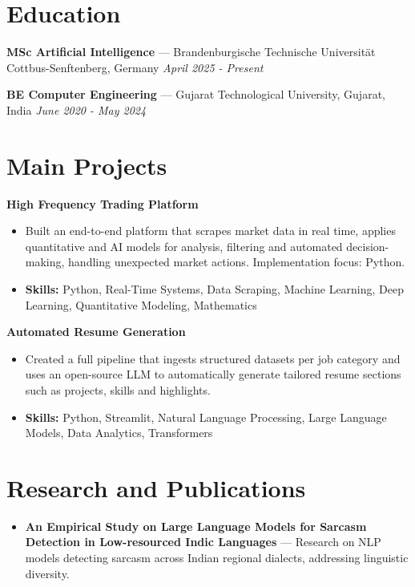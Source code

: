 \documentclass[a4paper,10pt]{article}
\begin{document}
\section*{Education}
\textbf{MSc Artificial Intelligence} — Brandenburgische Technische Universität Cottbus-Senftenberg, Germany \hfill \textit{April 2025 - Present}\par
\vspace{1.5pt}
\textbf{BE Computer Engineering} — Gujarat Technological University, Gujarat, India \hfill \textit{June 2020 - May 2024}\par

\section*{Main Projects}
\textbf{High Frequency Trading Platform}\par
\vspace{1pt}
\begin{itemize}
  \item Built an end-to-end platform that scrapes market data in real time, applies quantitative and AI models for analysis, filtering and automated decision-making, handling unexpected market actions. Implementation focus: Python.
  \item \textbf{Skills:} Python, Real-Time Systems, Data Scraping, Machine Learning, Deep Learning, Quantitative Modeling, Mathematics
\end{itemize}
\vspace{3pt}
\textbf{Automated Resume Generation}\par
\vspace{1pt}
\begin{itemize}
  \item Created a full pipeline that ingests structured datasets per job category and uses an open-source LLM to automatically generate tailored resume sections such as projects, skills and highlights.
  \item \textbf{Skills:} Python, Streamlit, Natural Language Processing, Large Language Models, Data Analytics, Transformers
\end{itemize}

\section*{Research and Publications}
\begin{itemize}
\item \textbf{An Empirical Study on Large Language Models for Sarcasm Detection in Low-resourced Indic Languages} — Research on NLP models detecting sarcasm across Indian regional dialects, addressing linguistic diversity.
\end{itemize}
\end{document}
